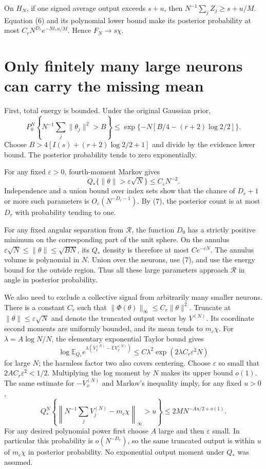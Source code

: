 \documentclass[11pt]{article}
\newcommand{\E}{\mathbb E}\newcommand{\Pp}{\mathbb P}
\begin{document}
On $H_N$, if one signed average output exceeds $s+u$, then
$N^{-1}\sum_jZ_j\ge s+u/M$. Equation (6) and its polynomial lower
bound make its posterior probability at most
$C_rN^{D_r}e^{-Nt_*u/M}$. Hence $F_N\to s\chi$.

\section{Only finitely many large neurons can carry the missing mean}
First, total energy is bounded. Under the original Gaussian prior,
\[
 P_0^N\left\{N^{-1}\sum_j\|\theta_j\|^2>B\right\}
 \le\exp\{-N[B/4-(r+2)\log2/2]\}.
\]
Choose $B>4[I(s)+(r+2)\log2/2+1]$ and divide by the evidence lower
bound. The posterior probability tends to zero exponentially.

For any fixed $\varepsilon>0$, fourth-moment Markov gives
\[
 Q_*\{\|\theta\|>\varepsilon\sqrt N\}\le C_\varepsilon N^{-2}.
\]
Independence and a union bound over index sets show that the chance of
$D_r+1$ or more such parameters is $O_\varepsilon(N^{-D_r-1})$.
By (7), the posterior count is at most $D_r$ with probability tending
to one.

For any fixed angular separation from $\mathcal R$, the function
$D_0$ has a strictly positive minimum on the corresponding part of
the unit sphere. On the annulus
$\varepsilon\sqrt N\le\|\theta\|\le\sqrt{BN}$, its $Q_*$ density
is therefore at most $Ce^{-cN}$. The annulus volume is polynomial
in $N$. Union over the neurons, use (7), and use the energy bound
for the outside region. Thus all these large parameters approach
$\mathcal R$ in angle in posterior probability.

We also need to exclude a collective signal from arbitrarily many
smaller neurons. There is a constant $C_r$ such that
$\|\Phi(\theta)\|_\infty\le C_r\|\theta\|^2$.
Truncate at $\|\theta\|\le\varepsilon\sqrt N$ and denote the
truncated output vector by $V^{(N)}$. Its coordinate second moments
are uniformly bounded, and its mean tends to $m_c\chi$.
For $\lambda=A\log N/N$, the elementary exponential Taylor bound gives
\[
 \log\E_{Q_*}e^{\lambda(V_x^{(N)}-\E V_x^{(N)})}
 \le C\lambda^2\exp(2\lambda C_r\varepsilon^2N)
\]
for large $N$; the harmless factor two also covers centering.
Choose $\varepsilon$ so small that $2AC_r\varepsilon^2<1/2$.
Multiplying the log moment by $N$ makes its upper bound $o(1)$.
The same estimate for $-V_x^{(N)}$ and Markov's inequality imply,
for any fixed $u>0$,
\[
 Q_*^N\left\{
 \left\|N^{-1}\sum_jV_j^{(N)}-m_c\chi\right\|_\infty>u
 \right\}\le 2M N^{-Au/2+o(1)}.                           \tag{8}
\]
For any desired polynomial power first choose $A$ large and then
$\varepsilon$ small. In particular this probability is $o(N^{-D_r})$,
so the same truncated output is within $u$ of $m_c\chi$ in posterior
probability. No exponential output moment under $Q_*$ was assumed.
\end{document}
